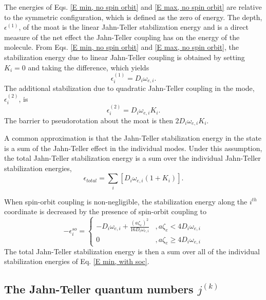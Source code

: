 \documentclass{article}
\begin{document}
The energies of Eqs. \ref{E min, no spin orbit} and \ref{E
max, no spin orbit} are relative to the symmetric configuration, which 
is defined as the zero of energy. The depth, $\epsilon ^{(1)}$, of the moat is the
linear Jahn-Teller stabilization energy and is a direct measure of the net
effect the Jahn-Teller coupling has on the energy of the
molecule. From Eqs. \ref{E min, no spin orbit} and \ref{E max,
  no spin orbit}, the stabilization energy due to linear Jahn-Teller
coupling is obtained by setting $K_i=0$ and taking the difference,
which yields
\begin{equation}
\epsilon _i^{(1)} = D_i \omega _{e,i}. 
\label{def of epsilon1}
\end{equation}
The additional stabilization due to quadratic Jahn-Teller coupling in
the mode, $\epsilon _i^{(2)}$, is
\begin{equation}
\epsilon _i^{(2)} = D_i \omega _{e,i} K_i. \label{def of epsilon2}
\end{equation}
The barrier to pseudorotation about the moat is then $2D_i \omega
_{e,i} K_i$.

A common approximation is that the Jahn-Teller stabilization 
energy in the state is a sum of the Jahn-Teller effect in the individual 
modes. Under this assumption, the total Jahn-Teller stabilization energy
is a sum over the individual Jahn-Teller stabilization energies,
\begin{equation}
\epsilon _{total} = \sum\limits _i \left[ D_i \omega _{e,i} 
\left( 1 + K_i \right) \right] .
\end{equation}

When spin-orbit coupling is non-negligible, the stabilization energy 
along the $i^{th}$ coordinate is decreased by the presence of spin-orbit
coupling to\cite{tab4}
\begin{equation}
-\epsilon _i^{so}=
\left\{ 
\begin{array}{ll}
-D_{i}\omega _{e,i}+\frac{\left( a\zeta _{e}\right) ^{2}}{16D_{i}\omega
_{e,i}} & ,a\zeta _{e}<4D_{i}\omega _{e,i} \\ 
0 & ,a\zeta _{e}\geq 4D_{i}\omega _{e,i}
\end{array} 
\right.  \label{E min, with soc} 
\end{equation}
The total Jahn-Teller stabilization energy is then a sum over all of
the individual stabilization energies of Eq. \ref{E min, with soc}.

\subsection{The Jahn-Teller quantum numbers $j^{(k)}$}
\end{document}
